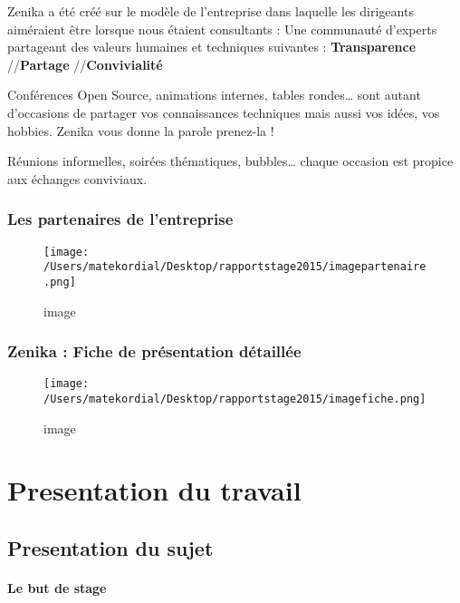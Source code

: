 Zenika a été créé sur le modèle de l'entreprise dans laquelle les dirigeants aiméraient être lorsque nous étaient consultants : Une communauté d'experts partageant des valeurs humaines et techniques suivantes : \textbf{Transparence} /\slash  \textbf{Partage} /\slash  \textbf{Convivialité} 


 Conférences Open Source, animations internes, tables rondes{\ldots} sont autant d'occasions de partager vos connaissances techniques mais aussi vos idées, vos hobbies. Zenika vous donne la parole prenez-la !


 Réunions informelles, soirées thématiques, bubbles{\ldots} chaque occasion est propice aux échanges conviviaux.



\subsection{Les partenaires de l'entreprise}
\label{lespartenairesdelentreprise}

\begin{figure}[htbp]
\centering
\texttt{[image: /Users/matekordial/Desktop/rapportstage2015/imagepartenaire.png]}
\caption{image}
\end{figure}

\subsection{Zenika : Fiche de présentation détaillée}
\label{zenika:fichedeprsentationdtaille}

\begin{figure}[htbp]
\centering
\texttt{[image: /Users/matekordial/Desktop/rapportstage2015/imagefiche.png]}
\caption{image}
\end{figure}

\chapter{Presentation du travail}
\label{presentationdutravail}

\section{Presentation du sujet}
\label{presentationdusujet}

\subsubsection{Le but de stage}
\label{lebutdestage}

